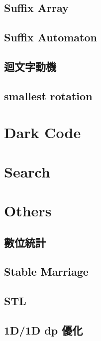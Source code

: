 \subsection{Suffix Array}

\subsection{Suffix Automaton}

\subsection{迴文字動機}

\subsection{smallest rotation}


\section{Dark Code}

%

\section{Search}


\section{Others}

\subsection{數位統計}

\subsection{Stable Marriage}

\subsection{STL}

\subsection{1D/1D dp 優化}

